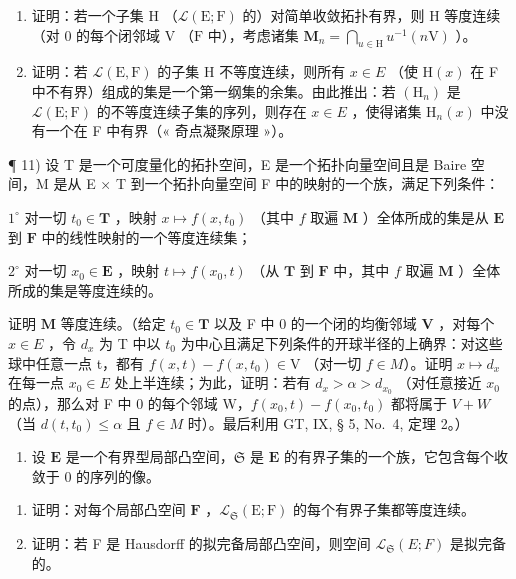\begin{enumerate}
\def\labelenumi{\alph{enumi})}
\item
  证明：若一个子集 \(\mathrm{H}\) （\(\mathcal{L}(\mathrm{E};\mathrm{F})\) 的）对简单收敛拓扑有界，则 \(\mathrm{H}\) 等度连续（对 0 的每个闭邻域 \(\mathrm{V}\) （\(\mathrm{F}\) 中），考虑诸集 \(\mathbf{M}_n = \bigcap_{u\in \mathrm{H}}u^{-1}(n\mathrm{V})\) ）。
\item
  证明：若 \(\mathcal{L}(\mathrm{E},\mathrm{F})\) 的子集 H 不等度连续，则所有 \(x\in E\) （使 \(\mathrm{H}(x)\) 在 F 中不有界）组成的集是一个第一纲集的余集。由此推出：若 \((\mathrm{H}_{n})\) 是 \(\mathcal{L}(\mathrm{E};\mathrm{F})\) 的不等度连续子集的序列，则存在 \(x\in E\) ，使得诸集 \(\mathrm{H}_{n}(x)\) 中没有一个在 F 中有界（« 奇点凝聚原理 »）。
\end{enumerate}

¶ 11) 设 T 是一个可度量化的拓扑空间，E 是一个拓扑向量空间且是 Baire 空间，M 是从 E × T 到一个拓扑向量空间 F 中的映射的一个族，满足下列条件：

\(1^{\circ}\) 对一切 \(t_0 \in \mathbf{T}\) ，映射 \(x \mapsto f(x, t_0)\) （其中 \(f\) 取遍 \(\mathbf{M}\) ）全体所成的集是从 \(\mathbf{E}\) 到 \(\mathbf{F}\) 中的线性映射的一个等度连续集；

\(2^{\circ}\) 对一切 \(x_0 \in \mathbf{E}\) ，映射 \(t \mapsto f(x_0, t)\) （从 \(\mathbf{T}\) 到 \(\mathbf{F}\) 中，其中 \(f\) 取遍 \(\mathbf{M}\) ）全体所成的集是等度连续的。

证明 \(\mathbf{M}\) 等度连续。（给定 \(t_0 \in \mathbf{T}\) 以及 F 中 0 的一个闭的均衡邻域 \(\mathbf{V}\) ，对每个 \(x \in E\) ，令 \(d_{x}\) 为 T 中以 \(t_{0}\) 为中心且满足下列条件的开球半径的上确界：对这些球中任意一点 t，都有 \(f(x, t) - f(x, t_{0}) \in \mathrm{V}\) （对一切 \(f \in M\)）。证明 \(x \mapsto d_{x}\) 在每一点 \(x_{0} \in E\) 处上半连续；为此，证明：若有 \(d_{x} > \alpha > d_{x_{0}}\) （对任意接近 \(x_{0}\) 的点），那么对 F 中 0 的每个邻域 W，\(f(x_{0}, t) - f(x_{0}, t_{0})\) 都将属于 \(V + W\) （当 \(d(t, t_{0}) \leqslant \alpha\) 且 \(f \in M\) 时）。最后利用 GT, IX, § 5, No.~4, 定理 2。）

\begin{enumerate}
\def\labelenumi{\arabic{enumi})}
\setcounter{enumi}{11}
\tightlist
\item
  设 \(\mathbf{E}\) 是一个有界型局部凸空间，\(\mathfrak{S}\) 是 \(\mathbf{E}\) 的有界子集的一个族，它包含每个收敛于 0 的序列的像。
\end{enumerate}

\begin{enumerate}
\def\labelenumi{\alph{enumi})}
\item
  证明：对每个局部凸空间 \(\mathbf{F}\) ，\(\mathcal{L}_{\mathfrak{S}}(\mathrm{E};\mathrm{F})\) 的每个有界子集都等度连续。
\item
  证明：若 F 是 Hausdorff 的拟完备局部凸空间，则空间 \(\mathcal{L}_{\mathfrak{S}}(E;F)\) 是拟完备的。
\end{enumerate}

